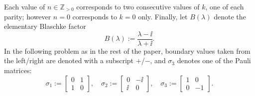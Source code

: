 Each value of $n\in\mathbb{Z}_{>0}$ corresponds to two consecutive values of $k$, one of each parity; however $n=0$ corresponds to $k=0$ only.  Finally, let $B(\lambda)$ denote the elementary Blaschke factor
\begin{equation}
B(\lambda):=\frac{\lambda-\ii}{\lambda+\ii}.
\label{eq:Blaschke}
\end{equation}
In the following problem as in the rest of the paper, boundary values taken from the left/right are denoted with a subscript $+$/$-$, and $\sigma_3$ denotes one of the Pauli matrices:
\begin{equation}
\sigma_1:=\begin{bmatrix}0&1\\1 & 0\end{bmatrix},\quad
\sigma_2:=\begin{bmatrix}0 & -\ii\\\ii & 0\end{bmatrix},\quad
\sigma_3:=\begin{bmatrix}1 & 0\\0 & -1\end{bmatrix}.
\end{equation} 
